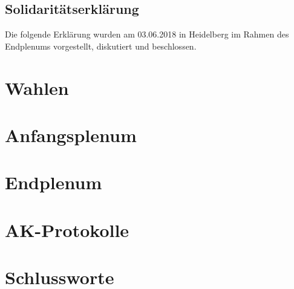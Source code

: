 \documentclass[ngerman, twoside, 10pt, openany, a5paper]{scrbook}
\begin{document}
  \newpage
  \section{Solidaritätserklärung}
    Die folgende Erklärung wurden am 03.06.2018 in Heidelberg im Rahmen des Endplenums
    vorgestellt, diskutiert und beschlossen.
      

\chapter{Wahlen}
  

\chapter{Anfangsplenum}
  
\chapter{Endplenum}
  

\chapter{AK-Protokolle}
  
  
  
  
  
  
  
  
  
  
  
  
  
  
  
  
  
  
  
  
  
  
  
  
  
  
  
  
  
  
  
  
  
  
  
  
  
  

\emptychapter
\chapter{Schlussworte}
  
\end{document}
